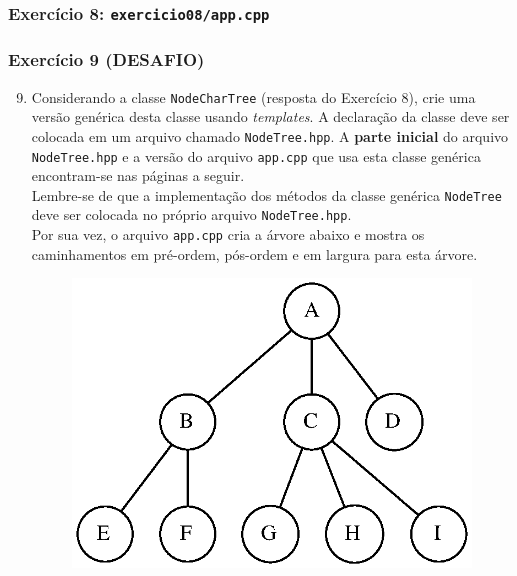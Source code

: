 \documentclass[aspectratio=169]{beamer}
\begin{document}
\begin{frame}[fragile]\frametitle{Exercício 8: \texttt{exercicio08/app.cpp}}

\end{frame}

\begin{frame}[fragile]\frametitle{Exercício 9 (DESAFIO)}
\begin{enumerate}
	\setcounter{enumi}{8}
	\footnotesize
	\item Considerando a classe \texttt{NodeCharTree} (resposta do Exercício 8), crie uma versão genérica desta classe usando \emph{templates}. A declaração da classe deve ser colocada em um arquivo chamado \texttt{NodeTree.hpp}. A \textbf{parte inicial} do arquivo \texttt{NodeTree.hpp} e a versão do arquivo \texttt{app.cpp} que usa esta classe genérica encontram-se nas páginas a seguir.\\
	Lembre-se de que a implementação dos métodos da classe genérica \texttt{NodeTree} deve ser colocada no próprio arquivo  \texttt{NodeTree.hpp}.\\
	Por sua vez, o arquivo \texttt{app.cpp} cria a árvore abaixo e mostra os caminhamentos em pré-ordem, pós-ordem e em largura para esta árvore.
\begin{figure}[h]
	\centering
	\includegraphics[height=0.3\paperheight]{imagens/arvore_d.eps}
\end{figure}
\end{enumerate}
\end{frame}
\end{document}
